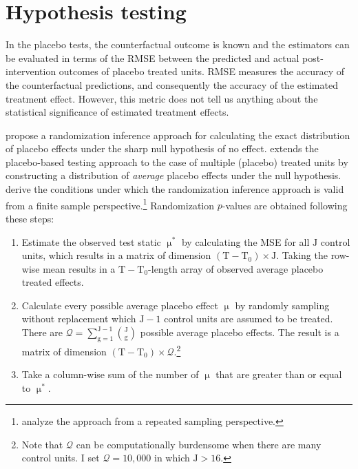 \documentclass[hidelinks,12pt]{article}
\begin{document}
\section{Hypothesis testing} \label{eval}

In the placebo tests, the counterfactual outcome is known and the estimators can be evaluated in terms of the RMSE between the predicted and actual post-intervention outcomes of placebo treated units. RMSE measures the accuracy of the counterfactual predictions, and consequently the accuracy of the estimated treatment effect. However, this metric does not tell us anything about the statistical significance of estimated treatment effects. 

\citet{abadie2010synthetic} propose a randomization inference approach for calculating the exact distribution of placebo effects under the sharp null hypothesis of no effect. \citet{cavallo2013catastrophic} extends the placebo-based testing approach to the case of multiple (placebo) treated units by constructing a distribution of \emph{average} placebo effects under the null hypothesis. \citet{firpo2018synthetic} derive the conditions under which the randomization inference approach is valid from a finite sample perspective.\footnote{\citet{hahn2017synthetic} analyze the approach from a repeated sampling perspective.} Randomization $p$-values are obtained following these steps:

\begin{enumerate} 
	\item Estimate the observed test static $\upmu^{*}$ by calculating the MSE for all $\text{J}$ control units, which results in a matrix of dimension $(\text{T}-\text{T}_0) \times \text{J}$. Taking the row-wise mean results in a $\text{T}-\text{T}_0$-length array of observed average placebo treated effects. 
	\item Calculate every possible average placebo effect $\upmu$ by randomly sampling without replacement which $\text{J}-1$ control units are assumed to be treated. There are $\mathcal{Q} = \sum\limits_{\text{g}=1}^{\text{J}-1} {\text{J} \choose \text{g}}$ possible average placebo effects. The result is a matrix of dimension $(\text{T}-\text{T}_0) \times \mathcal{Q}$.\footnote{Note that $\mathcal{Q}$ can be computationally burdensome when there are many control units. I set $\mathcal{Q} = 10,000$ in which $\text{J} > 16$.}
	\item Take a column-wise sum of the number of $\upmu$ that are greater than or equal to $\upmu^{*}$.  
\end{enumerate}
\end{document}
